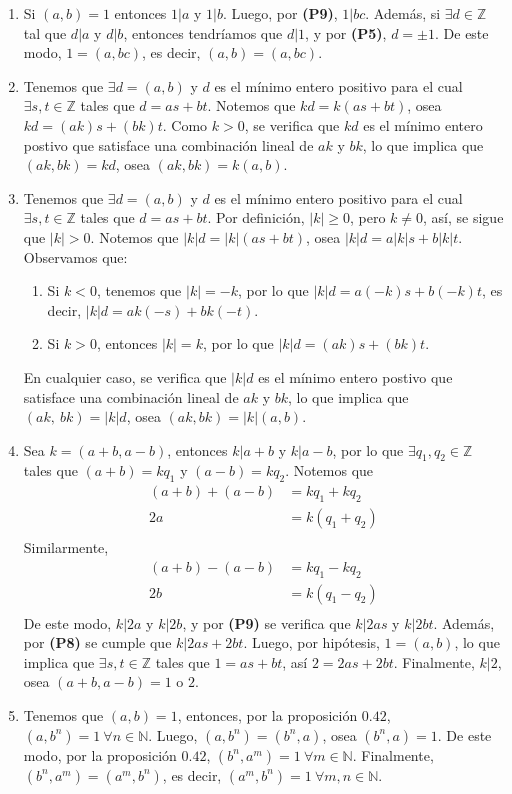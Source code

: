 \documentclass[11pt]{article}
\newcommand{\N}{\mathbb{N}}
\newcommand{\Z}{\mathbb{Z}}
\begin{document}
\begin{enumerate}[start=10]
  \item Si $(a,b)=1$ entonces $1|a$ y $1|b$. Luego, por \textbf{(P9)}, $1|bc$. Además, si $\exists d \in \Z$ tal que $d|a$ y $d|b$, entonces tendríamos que $d|1$, y por \textbf{(P5)},  $d= \pm 1$. De este modo, $1=(a,bc)$, es decir, $(a,b)=(a,bc)$.
  \item Tenemos que $\exists d=(a,b)$ y $d$ es el mínimo entero positivo para el cual $\exists s,t\in\Z$ tales que $d=as+bt$. Notemos que $kd=k(as+bt)$, osea $kd=(ak)s+(bk)t$. Como $k>0$, se verifica que $kd$ es el mínimo entero postivo que satisface una combinación lineal de $ak$ y $bk$, lo que implica que $(ak,bk)=kd$, osea $(ak,bk)=k(a,b)$.
  \item Tenemos que $\exists d=(a,b)$ y $d$ es el mínimo entero positivo para el cual $\exists s,t\in\Z$ tales que $d=as+bt$. Por definición, $|k|\geq 0$, pero $k \neq 0$, así, se sigue que $|k|>0$. Notemos que $|k|d=|k|(as+bt)$, osea $|k|d=a|k|s+b|k|t$. Observamos que:
    \begin{enumerate}[label=\roman*)]
      \item Si $k<0$, tenemos que $|k|=-k$, por lo que  $|k|d=a(-k)s+b(-k)t$, es decir, $|k|d=ak(-s)+bk  (-t)$.
      \item Si $k>0$, entonces $|k|=k$, por lo que $|k| d=(ak)s+(bk)t$.
    \end{enumerate}
  En cualquier caso, se verifica que $|k|d$ es el mínimo entero postivo que satisface una combinación lineal de $ak$ y $bk$, lo que implica que $(ak, \ bk)=|k|d$, osea $(ak,bk)=|k|(a,b)$.
  \item Sea $k=(a+b,a-b)$, entonces $k|a+b$ y $k|a-b$, por lo que $\exists q_1,q_2 \in \Z$ tales que $(a+b)=kq_1$ y $(a-b)=kq_2$. Notemos que
    \begin{align*}
      (a+b)+(a-b) &= kq_1+kq_2 \\
      2a &= k(q_1+q_2) \\
    \end{align*}
  Similarmente, 
    \begin{align*}
      (a+b)-(a-b) &= kq_1-kq_2 \\
      2b &= k(q_1-q_2) \\
    \end{align*}
  De este modo, $k|2a$ y $k|2b$, y por \textbf{(P9)} se verifica que $k|2as$ y $k|2bt$. Además, por \textbf{(P8)} se cumple que $k|2as+2bt$. Luego, por hipótesis, $1=(a,b)$, lo que implica que $\exists s,t\in \Z$ tales que $1=as+bt$, así $2=2as+2bt$. Finalmente, $k|2$, osea $(a+b,a-b)=1$ o $2$.
  \item Tenemos que $(a,b)=1$, entonces, por la proposición $0.42$, $(a,b^n)=1 \ \forall n\in \N$. Luego, $(a,b^n)=(b^n,a)$, osea $(b^n,a)=1$. De este modo, por la proposición $0.42$, $(b^n,a^m)=1 \ \forall m\in \N$. Finalmente, $(b^n,a^m)=(a^m,b^n)$, es decir, $(a^m,b^n)=1 \ \forall m,n\in \N$.

\end{enumerate}
\end{document}
